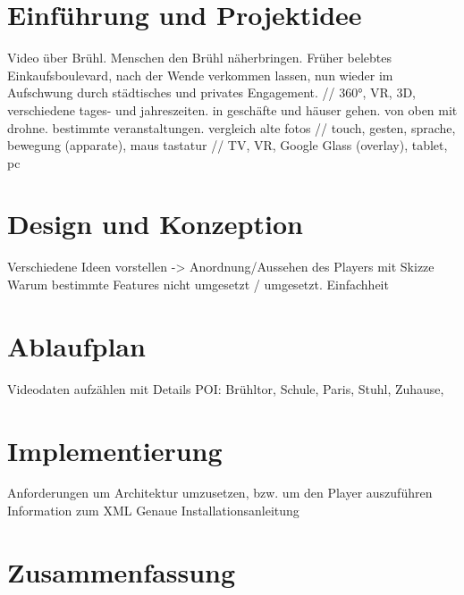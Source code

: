 \chapter{Einführung und Projektidee}
Video über Brühl. Menschen den Brühl näherbringen. Früher belebtes Einkaufsboulevard, nach der Wende verkommen lassen, nun wieder im Aufschwung durch städtisches und privates Engagement. // 360°, VR, 3D, verschiedene tages- und jahreszeiten. in geschäfte und häuser gehen. von oben mit drohne. bestimmte veranstaltungen. vergleich alte fotos // touch, gesten, sprache, bewegung (apparate), maus tastatur // TV, VR, Google Glass (overlay), tablet, pc
\chapter{Design und Konzeption}
Verschiedene Ideen vorstellen -> Anordnung/Aussehen des Players mit Skizze
Warum bestimmte Features nicht umgesetzt / umgesetzt. Einfachheit
\chapter{Ablaufplan}
Videodaten aufzählen mit Details
POI: Brühltor, Schule, Paris, Stuhl, Zuhause, 
\chapter{Implementierung}
Anforderungen um Architektur umzusetzen, bzw. um den Player auszuführen
Information zum XML
Genaue Installationsanleitung
\chapter{Zusammenfassung}




